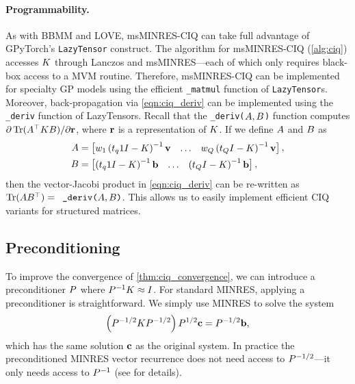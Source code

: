 \paragraph{Programmability.}
As with BBMM and LOVE, msMINRES-CIQ can take full advantage of GPyTorch's {\tt LazyTensor} construct.
The algorithm for msMINRES-CIQ (\cref{alg:ciq}) accesses $K$ through Lanczos and msMINRES---each of which only requires black-box access to a MVM routine.
Therefore, msMINRES-CIQ can be implemented for specialty GP models using the efficient {\tt \_matmul} function of {\tt LazyTensor}s.
Moreover, back-propagation via \cref{eqn:ciq_deriv} can be implemented using the {\tt \_deriv} function of LazyTensors.
Recall that the {\tt \_deriv($ A, B $)} function computes $\partial \tr{ \bA^\top \bK \bB }/{\partial \br}$, where $\mathbf{r}$ is a representation of $K$.
If we define $A$ and $B$ as
%
\begin{align*}
  A &= \begin{bmatrix}
    w_1 \left( t_q1I - K \right)^{-1} \mathbf{v}
    & \ldots &
    w_Q \left( t_Q I - K \right)^{-1} \mathbf{v}
  \end{bmatrix},
  \\
  B &= \begin{bmatrix}
    \left( t_q1I - K \right)^{-1} \mathbf{b}
    & \ldots &
    \left( t_Q I - K \right)^{-1} \mathbf{b}
  \end{bmatrix},
\end{align*}
%
then the vector-Jacobi product in \cref{eqn:ciq_deriv} can be re-written as $\tr{ \bA \bB^\top } = \texttt{ \_deriv($\bA, \bB$)}$.
This allows us to easily implement efficient CIQ variants for structured matrices.


\subsection{Preconditioning}
\label{sec:ciq_precond}

To improve the convergence of \cref{thm:ciq_convergence}, we can introduce a preconditioner $P$ where $P^{-1} K \approx I$.
For standard MINRES, applying a preconditioner is straightforward.
We simply use MINRES to solve the system
\[
  \left( P^{-1/2} K P^{-1/2} \right) P^{1/2} \mathbf{c} = P^{-1/2} \mathbf{b},
\]
which has the same solution $\mathbf{c}$ as the original system.
In practice the preconditioned MINRES vector recurrence does not need access to $P^{-1/2}$---it only needs access to $P^{-1}$
(see \citep[][Ch. 3.4]{choi2006iterative} for details).


